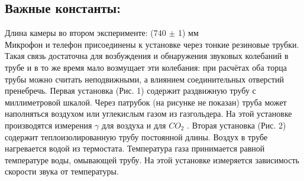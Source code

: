 \documentclass[11pt,a4paper]{article}
\begin{document}
  \subsection*{Важные константы:}
    Длина камеры во втором эксперименте: (740 $\pm$ 1) мм\\
  Микрофон и телефон присоединены к установке через тонкие резиновые трубки. 
  Такая связь достаточна для возбуждения и обнаружения звуковых колебаний 
  в трубе и в то же время мало возмущает эти колебания: при расчётах оба торца трубы можно считать неподвижными, а
  влиянием соединительных отверстий пренебречь.
  Первая установка (Рис. 1) содержит раздвижную трубу с миллиметровой шкалой. 
  Через патрубок (на рисунке не показан) труба может наполняться воздухом 
  или углекислым газом из газгольдера. На
  этой установке производятся измерения $\gamma$ для воздуха и для $CO_2$ . 
  Вторая установка (Рис. 2) содержит теплоизолированную трубу постоянной
  длины. Воздух в трубе нагревается водой из термостата. Температура
  газа принимается равной температуре воды, омывающей трубу. На этой
  установке измеряется зависимость скорости звука от температуры.

\newpage
\end{document}

